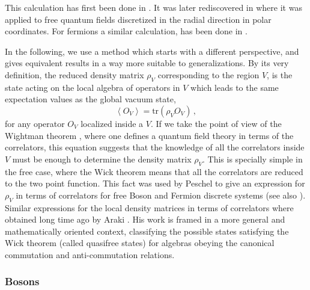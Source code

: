\documentclass[a4paper]{article}
\begin{document}
This calculation has first been done in \cite{bombelli}. It was later rediscovered in \cite{srednicki} where it was applied to free quantum fields discretized in the radial direction in polar coordinates. For fermions a similar calculation, has been done in \cite{vidal}. 

In the following, we use a method which starts with a different perspective, and gives equivalent results in a way more suitable to generalizations. By its very definition, the reduced density matrix $\rho_V$ corresponding to the region $V$, is the state acting on the local algebra of operators in $V$ which leads to the same expectation values as the global vacuum state,
\begin{equation}
\left\langle O_{V}\right\rangle =\textrm{tr}(\rho
_{V}O_{V})\,,\label{nueve}
\end{equation}
 for any
operator $O_{V}$ localized inside a $V$. If we take the point of view of the Wightman theorem \cite{wightman}, where one defines a quantum field theory in terms of the correlators, this equation suggests that the knowledge of all the correlators inside $V$ must be enough to determine the density matrix $\rho_V$. This is specially simple in the free case, where the Wick theorem means that all the correlators are reduced to the two point function. This fact was
used by Peschel to give an expression for $\rho _{V}$ in
terms of correlators for free Boson and Fermion discrete systems \cite{peschel} (see also \cite{vidal}). Similar expressions for the local density matrices in terms of correlators where obtained long time ago by Araki \cite{araki}. His work is framed in a more general and mathematically oriented context, classifying the possible states satisfying the Wick theorem (called quasifree states) for algebras obeying the canonical commutation and anti-commutation relations.   

\subsubsection{Bosons}
\end{document}
